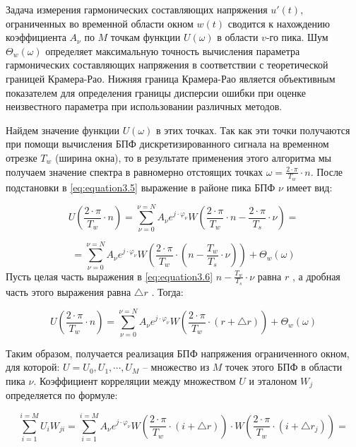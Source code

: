Задача измерения гармонических составляющих напряжения $u'(t)$, ограниченных во временной области окном $w(t)$ сводится к нахождению коэффициента $A_\nu$ по $M$ точкам функции $U(\omega)$ в области $v$-го пика. Шум $\Theta_w(\omega) $   определяет максимальную точность вычисления параметра гармонических составляющих напряжения в соответствии с теоретической границей Крамера-Рао. Нижняя граница Крамера-Рао является объективным показателем для определения границы дисперсии ошибки при оценке неизвестного параметра при использовании различных методов. 

Найдем значение функции $U(\omega)$  в этих точках. Так как эти точки получаются при помощи вычисления БПФ дискретизированного сигнала на временном отрезке $T_w$ (ширина окна), то в результате применения этого алгоритма мы получаем значение спектра в равномерно отстоящих точках $ \omega = \frac{2 \cdot \pi}{T_w} \cdot n$. После подстановки   в \ref{eq:equation3.5} выражение в районе пика БПФ $\nu$ имеет вид:

\begin{equation}
	\label{eq:equation3.6}
	U \left(\frac{2 \cdot \pi}{T_w} \cdot n \right) = \displaystyle\sum_{\nu=0}^{\nu=N} A_{\nu} e^{j \cdot \varphi_\nu} W\left( {\frac{2 \cdot \pi}{T_w} \cdot n - \frac{2 \cdot \pi}{T_s} \cdot \nu }\right) = 
\end{equation}

$$
=  \displaystyle\sum_{\nu=0}^{\nu=N} A_{\nu} e^{j \cdot \varphi_\nu} W \left({\frac{2 \cdot \pi}{T_w} \cdot \left( {n - \frac{T_w}{T_s} \cdot \nu} \right) } \right) + \Theta_w(\omega)
$$
Пусть целая часть выражения в \ref{eq:equation3.6} $ n - \frac{T_w}{T_s} \cdot \nu$  равна $r$ , а дробная часть этого выражения равна $ \bigtriangleup r$ . Тогда: 

\begin{equation}
	\label{eq:equation3.7}
	U \left(\frac{2 \cdot \pi}{T_w} \cdot n \right) = \displaystyle\sum_{\nu=0}^{\nu=N} A_{\nu} e^{j \cdot \varphi_\nu} W\left( {\frac{2 \cdot \pi}{T_w} \cdot (r + \bigtriangleup r ) }\right) + \Theta_w(\omega)
\end{equation}

Таким образом, получается реализация БПФ напряжения ограниченного окном, для которой: $U = {U_0, U_1, \cdots , U_M} $ – множество из $M$ точек этого БПФ в области пика $\nu$.
Коэффициент корреляции между множеством $U$ и эталоном $W_j$ определяется по формуле:

\begin{equation}
	\label{eq:equation3.8}
	\displaystyle\sum_{i=1}^{i=M} U_i W_{ji} = \displaystyle\sum_{i=1}^{i=M} A_{\nu} e^{j \cdot \varphi_\nu} W\left( {\frac{2 \cdot \pi}{T_w} \cdot (i + \bigtriangleup r ) }\right) \cdot W\left( {\frac{2 \cdot \pi}{T_w} \cdot (i + \bigtriangleup r_j ) }\right) =
\end{equation}

